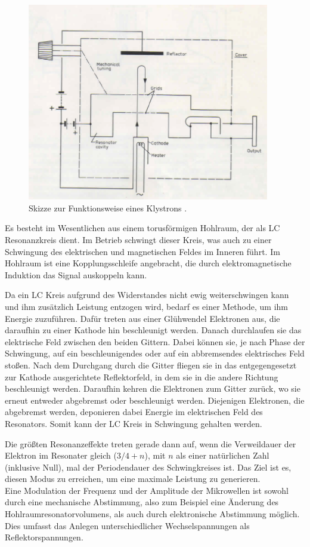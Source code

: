 \begin{figure}
  \centering
  \includegraphics[width=300pt]{data/klystron.png}
  \caption{Skizze zur Funktionsweise eines Klystrons \cite{Versuchsanleitung_alt}.}
  \label{fig:klystron}
\end{figure}

Es besteht im Wesentlichen aus einem torusförmigen Hohlraum, der als LC Resonanzkreis
dient. Im Betrieb schwingt dieser Kreis, was auch zu einer Schwingung des elektrischen
und magnetischen Feldes im Inneren führt. Im Hohlraum ist eine Kopplungsschleife
angebracht, die durch elektromagnetische Induktion das Signal auskoppeln kann.

Da ein LC Kreis aufgrund des Widerstandes nicht ewig weiterschwingen kann und ihm
zusätzlich Leistung entzogen wird, bedarf es einer Methode, um ihm Energie zuzuführen.
Dafür treten aus einer Glühwendel Elektronen aus, die daraufhin zu einer Kathode hin
beschleunigt werden. Danach durchlaufen sie das elektrische Feld zwischen den beiden
Gittern. Dabei können sie, je nach Phase der Schwingung, auf ein beschleunigendes
oder auf ein abbremsendes elektrisches Feld stoßen. Nach dem Durchgang durch die Gitter fliegen sie in das entgegengesetzt
zur Kathode ausgerichtete Reflektorfeld, in dem sie in die andere Richtung beschleunigt
werden. Daraufhin kehren die Elektronen zum Gitter zurück, wo sie erneut entweder
abgebremst oder beschleunigt werden. Diejenigen Elektronen, die abgebremst werden,
deponieren dabei Energie im elektrischen Feld des Resonators. Somit kann der LC Kreis
in Schwingung gehalten werden.

Die größten Resonanzeffekte treten gerade dann auf, wenn die Verweildauer der Elektron im Resonater
gleich ($3/4 + n$), mit $n$ als einer natürlichen Zahl (inklusive Null), mal der Periodendauer des Schwingkreises ist. Das Ziel ist es, diesen Modus zu erreichen, um
eine maximale Leistung zu generieren.\\
Eine Modulation der Frequenz und der Amplitude der Mikrowellen ist sowohl durch eine mechanische Abstimmung, also zum Beispiel eine Änderung des Hohlraumresonatorvolumens, als auch durch elektronische Abstimmung möglich. Dies umfasst das Anlegen unterschiedlicher Wechselspannungen als Reflektorspannungen.
